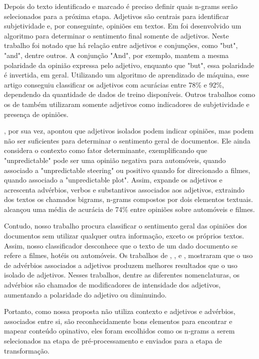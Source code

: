 \documentclass[template.tex]{subfiles}
\begin{document}
Depois do texto identificado e marcado é preciso definir quais n-grams serão selecionados para a próxima etapa. Adjetivos são centrais para identificar subjetividade e, por conseguinte, opiniões em textos. Em  foi desenvolvido um algoritmo para determinar o sentimento final somente de adjetivos. Neste trabalho foi notado que há relação entre adjetivos e conjunções, como "but", "and", dentre outros. A conjunção "And", por exemplo, mantem a mesma polaridade da opinião expressa pelo adjetivo, enquanto que "but", essa polaridade é invertida, em geral. Utilizando um algoritmo de aprendizado de máquina, esse artigo conseguiu classificar os adjetivos com acurácias entre 78\% e 92\%, dependendo da quantidade de dados de treino disponíveis. Outros trabalhos como os de  também utilizaram somente adjetivos como indicadores de subjetividade e presença de opiniões.

, por sua vez, apontou que adjetivos isolados podem indicar opiniões, mas podem não ser suficientes para determinar o sentimento geral de documentos. Ele ainda considera o contexto como fator determinante, exemplificando que "unpredictable" pode ser uma opinião negativa para automóveis, quando associado a "unpredictable steering" ou positivo quando for direcionado a filmes, quando associado a "unpredictable plot". Assim,  expande os adjetivos e acrescenta advérbios, verbos e substantivos associados aos adjetivos, extraindo dos textos os chamados bigrams, n-grams compostos por dois elementos textuais.  alcançou uma média de acurácia de 74\% entre opiniões sobre automóveis e filmes. 

Contudo, nosso trabalho procura classificar o sentimento geral das opiniões dos documentos sem utilizar qualquer outra informação, exceto os próprios textos. Assim, nosso classificador desconhece que o texto de um dado documento se refere a filmes, hotéis ou automóveis. Os trabalhos de , ,  e , mostraram que o uso de advérbios associados a adjetivos produzem melhores resultados que o uso isolado de adjetivos. Nesses trabalhos, dentre as diferentes nomenclaturas, os advérbios são chamados de modificadores de intensidade dos adjetivos, aumentando a polaridade do adjetivo ou diminuindo. 

Portanto, como nossa proposta não utiliza contexto e adjetivos e advérbios, associados entre si, são reconhecidamente bons elementos para encontrar e mapear conteúdo opinativo, eles foram escolhidos como os n-grams a serem selecionados na etapa de pré-processamento e enviados para a etapa de transformação.
\end{document}
